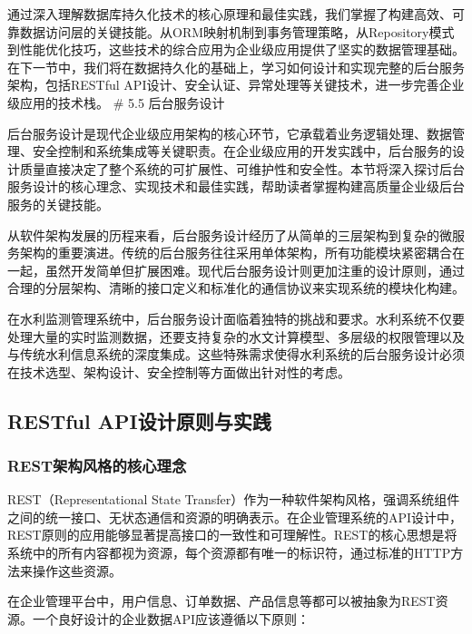 通过深入理解数据库持久化技术的核心原理和最佳实践，我们掌握了构建高效、可靠数据访问层的关键技能。从ORM映射机制到事务管理策略，从Repository模式到性能优化技巧，这些技术的综合应用为企业级应用提供了坚实的数据管理基础。在下一节中，我们将在数据持久化的基础上，学习如何设计和实现完整的后台服务架构，包括RESTful API设计、安全认证、异常处理等关键技术，进一步完善企业级应用的技术栈。 \# 5.5 后台服务设计

后台服务设计是现代企业级应用架构的核心环节，它承载着业务逻辑处理、数据管理、安全控制和系统集成等关键职责。在企业级应用的开发实践中，后台服务的设计质量直接决定了整个系统的可扩展性、可维护性和安全性。本节将深入探讨后台服务设计的核心理念、实现技术和最佳实践，帮助读者掌握构建高质量企业级后台服务的关键技能。

从软件架构发展的历程来看，后台服务设计经历了从简单的三层架构到复杂的微服务架构的重要演进。传统的后台服务往往采用单体架构，所有功能模块紧密耦合在一起，虽然开发简单但扩展困难。现代后台服务设计则更加注重的设计原则，通过合理的分层架构、清晰的接口定义和标准化的通信协议来实现系统的模块化构建。

在水利监测管理系统中，后台服务设计面临着独特的挑战和要求。水利系统不仅要处理大量的实时监测数据，还要支持复杂的水文计算模型、多层级的权限管理以及与传统水利信息系统的深度集成。这些特殊需求使得水利系统的后台服务设计必须在技术选型、架构设计、安全控制等方面做出针对性的考虑。

\hypertarget{restful-apiux8bbeux8ba1ux539fux5219ux4e0eux5b9eux8df5}{%
\subsection{RESTful API设计原则与实践}\label{restful-apiux8bbeux8ba1ux539fux5219ux4e0eux5b9eux8df5}}

\hypertarget{restux67b6ux6784ux98ceux683cux7684ux6838ux5fc3ux7406ux5ff5}{%
\subsubsection{REST架构风格的核心理念}\label{restux67b6ux6784ux98ceux683cux7684ux6838ux5fc3ux7406ux5ff5}}

REST（Representational State Transfer）作为一种软件架构风格，强调系统组件之间的统一接口、无状态通信和资源的明确表示。在企业管理系统的API设计中，REST原则的应用能够显著提高接口的一致性和可理解性。REST的核心思想是将系统中的所有内容都视为资源，每个资源都有唯一的标识符，通过标准的HTTP方法来操作这些资源。

在企业管理平台中，用户信息、订单数据、产品信息等都可以被抽象为REST资源。一个良好设计的企业数据API应该遵循以下原则：

